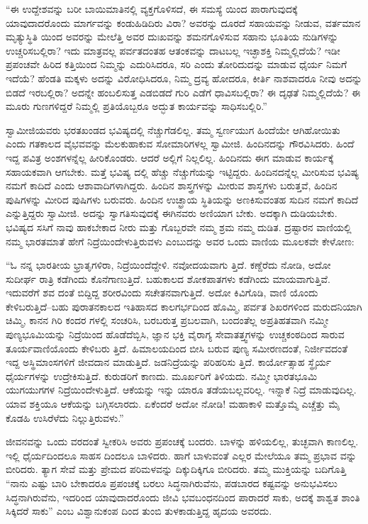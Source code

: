 “ಈ ಉದ್ದೇಶವನ್ನು ಬರೀ ಬಾಯಿಮಾತಿನಲ್ಲಿ ವ್ಯಕ್ತಗೊಳಿಸದೆ, ಈ ಸಮಸ್ಯೆ ಯಿಂದ ಪಾರಾಗುವುದಕ್ಕೆ ಯಾವುದಾದರೊಂದು ಮಾರ್ಗವನ್ನು ಕಂಡುಹಿಡಿದಿರು ವಿರಾ? ಅವರನ್ನು ದೂರದೆ ಸಹಾಯವನ್ನು ನೀಡುವ, ವರ್ತಮಾನ ಮೃತ್ಯುಸ್ಥಿತಿ ಯಿಂದ ಅವರನ್ನು ಮೇಲೆತ್ತಿ ಅವರ ದುಃಖವನ್ನು ಶಮನಗೊಳಿಸುವ ಸಹಾನು ಭೂತಿಯ ನುಡಿಗಳನ್ನು ಉಚ್ಚರಿಸಬಲ್ಲಿರಾ? ಇದು ಮಾತ್ರವಲ್ಲ ಪರ್ವತದಂತಹ ಆತಂಕವನ್ನು ದಾಟಬಲ್ಲ ಇಚ್ಛಾಶಕ್ತಿ ನಿಮ್ಮಲ್ಲಿದೆಯೆ? ಇಡೀ ಪ್ರಪಂಚವೇ ಹಿರಿದ ಕತ್ತಿಯಿಂದ ನಿಮ್ಮನ್ನು ಎದುರಿಸಿದರೂ, ಸರಿ ಎಂದು ತೋರಿದುದನ್ನು ಮಾಡುವ ಧೈರ್ಯ ನಿಮಗೆ ಇದೆಯೆ? ಹೆಂಡತಿ ಮಕ್ಕಳು ಅದನ್ನು ವಿರೋಧಿಸಿದರೂ, ನಿಮ್ಮ ದ್ರವ್ಯ ಹೋದರೂ, ಕೀರ್ತಿ ನಾಶವಾದರೂ ನೀವು ಅದನ್ನು ಬಿಡದೆ ಇರಬಲ್ಲಿರಾ? ಅದನ್ನೇ ಹಂಬಲಿಸುತ್ತ ಎಡಬಿಡದೆ ಗುರಿ ಎಡೆಗೆ ಧಾವಿಸಬಲ್ಲಿರಾ? ಈ ದೃಢತೆ ನಿಮ್ಮಲ್ಲಿದೆಯೆ? ಈ ಮೂರು ಗುಣಗಳಿದ್ದರೆ ನಿಮ್ಮಲ್ಲಿ ಪ್ರತಿಯೊಬ್ಬರೂ ಅದ್ಭುತ ಕಾರ್ಯವನ್ನು ಸಾಧಿಸಬಲ್ಲಿರಿ.”

ಸ್ವಾಮೀಜಿಯವರು ಭರತಖಂಡದ ಭವಿಷ್ಯದಲ್ಲಿ ನೆಚ್ಚುಗೆಡಲಿಲ್ಲ. ತಮ್ಮ ಸ್ವರ್ಣಯುಗ ಹಿಂದೆಯೇ ಆಗಿಹೋಯಿತು ಎಂದು ಗತಕಾಲದ ವೈಭವವನ್ನು ಮೆಲಕುಹಾಕುವ ಸೋಮಾರಿಗಳಲ್ಲ ಸ್ವಾಮೀಜಿ. ಹಿಂದಿನದನ್ನು ಗೌರವಿಸಿದರು. ಹಿಂದೆ ಇದ್ದ ಪವಿತ್ರ ಅಂಶಗಳನ್ನೆಲ್ಲ ಹೀರಿಕೊಂಡರು. ಆದರೆ ಅಲ್ಲಿಗೆ ನಿಲ್ಲಲಿಲ್ಲ. ಹಿಂದಿನದು ಈಗ ಮಾಡುವ ಕಾರ್ಯಕ್ಕೆ ಸಹಾಯಕವಾಗಿ ಆಗಬೇಕು. ಮತ್ತೆ ಭವಿಷ್ಯ ದಲ್ಲಿ ಹೆಚ್ಚು ನೆಚ್ಚುಗೆಯನ್ನು ಇಟ್ಟಿದ್ದರು. ಹಿಂದಿನದನ್ನೆಲ್ಲ ಮೀರಿಸುವ ಭವಿಷ್ಯ ನಮಗೆ ಕಾದಿದೆ ಎಂದು ಆಶಾವಾದಿಗಳಾಗಿದ್ದರು. ಹಿಂದಿನ ಶಾಸ್ತ್ರಗಳನ್ನು ಮೀರುವ ಶಾಸ್ತ್ರಗಳು ಬರುತ್ತವೆ, ಹಿಂದಿನ ಪುಷಿಗಳನ್ನು ಮೀರಿದ ಪುಷಿಗಳು ಬರುವರು. ಹಿಂದಿನ ಉಚ್ಛ್ರಾಯ ಸ್ಥಿತಿಯನ್ನು ಅಣಕಿಸುವಂತಹ ಸುದಿನ ನಮಗೆ ಕಾದಿದೆ ಎನ್ನುತ್ತಿದ್ದರು ಸ್ವಾಮೀಜಿ. ಅದನ್ನು ಸ್ವಾಗತಿಸುವುದಕ್ಕೆ ಈಗಿನವರು ಅಣಿಯಾಗ ಬೇಕು. ಅದಕ್ಕಾಗಿ ದುಡಿಯಬೇಕು. ಭವಿಷ್ಯದ ಸಸಿಗೆ ನಾವು ಹಾಕಬೇಕಾದ ನೀರು ಮತ್ತು ಗೊಬ್ಬರವೇ ನಮ್ಮ ಶ್ರಮ ನಮ್ಮ ದುಡಿತ. ದ್ರಷ್ಟಾರನ ವಾಣಿಯಲ್ಲಿ ನಮ್ಮ ಭಾರತಮಾತೆ ಹೇಗೆ ನಿದ್ರೆಯಿಂದೇಳುತ್ತಿರುವಳು ಎಂಬುದನ್ನು ಅವರ ಒಂದು ವಾಣಿಯ ಮೂಲಕವೇ ಕೇಳೋಣ:

“ಓ ನನ್ನ ಭಾರತೀಯ ಭ್ರಾತೃಗಳಿರಾ, ನಿದ್ರೆಯಿಂದೆದ್ದೇಳಿ. ನವೋದಯವಾಗು ತ್ತಿದೆ. ಕಣ್ದೆರೆದು ನೋಡಿ, ಅದೋ ಸುದೀರ್ಘ ರಾತ್ರಿ ಕಡೆಗಿಂದು ಕೊನೆಗಾಣುತ್ತಿದೆ. ಬಹುಕಾಲದ ಶೋಕಪಾತಗಳು ಕಡೆಗಿಂದು ಮಾಯವಾಗುತ್ತಿವೆ. ಇದುವರೆಗೆ ಶವ ದಂತೆ ಬಿದ್ದಿದ್ದ ಶರೀರವಿಂದು ಸಚೇತನವಾಗುತ್ತಿದೆ. ಅದೋ ಕಿವಿಗೊಡಿ, ವಾಣಿ ಯೊಂದು ಕೇಳಿಬರುತ್ತಿದೆ–ಬಹು ಪುರಾತನಕಾಲದ ಇತಿಹಾಸದ ಕಾಲಗರ್ಭದಿಂದ ಹೊಮ್ಮಿ, ಪರ್ವತ ಶಿಖರಗಳಿಂದ ಮರುದನಿಯಾಗಿ ಚಿಮ್ಮಿ, ಕಾನನ ಗಿರಿ ಕಂದರ ಗಳಲ್ಲಿ ಸಂಚರಿಸಿ, ಬರಬರುತ್ತ ಪ್ರಬಲವಾಗಿ, ಬಂದಂತೆಲ್ಲ ಅಪ್ರತಿಹತವಾಗಿ ನಮ್ಮೀ ಪುಣ್ಯಭೂಮಿಯನ್ನು ನಿದ್ರೆಯಿಂದ ಹೊಡೆದೆಬ್ಬಿಸಿ, ಜ್ಞಾನ ಭಕ್ತಿ ವೈರಾಗ್ಯ ಸೇವಾತತ್ತ್ವಗಳನ್ನು ಉಚ್ಚಕಂಠದಿಂದ ಸಾರುವ ತೂರ್ಯವಾಣಿಯೊಂದು ಕೇಳಿಬರು ತ್ತಿದೆ. ಹಿಮಾಲಯದಿಂದ ಬೀಸಿ ಬರುವ ಪುಣ್ಯ ಸಮೀರಣದಂತೆ, ನಿರ್ಜೀವದಂತೆ ಇದ್ದ ಅಸ್ಥಿಮಾಂಸಗಳಿಗೆ ಜೀವದಾನ ಮಾಡುತ್ತಿದೆ. ಜಡನಿದ್ರೆಯನ್ನು ಪರಿಹರಿಸು ತ್ತಿದೆ. ಕಾರ್ಯೋತ್ಸಾಹ ಸ್ಥೈರ್ಯ ಧೈರ್ಯಗಳನ್ನು ಉದ್ರೇಕಿಸುತ್ತಿದೆ. ಕುರುಡರಿಗೆ ಕಾಣದು. ಮೂರ್ಖರಿಗೆ ತಿಳಿಯದು. ನಮ್ಮೀ ಭಾರತಭೂಮಿ ಯುಗಯುಗಗಳ ನಿದ್ರೆಯಿಂದೇಳುತ್ತಿದೆ. ಆಕೆಯನ್ನು ಇನ್ನು ಯಾರೂ ತಡೆಯಬಲ್ಲವರಿಲ್ಲ. ಇನ್ನಾಕೆ ನಿದ್ರೆ ಮಾಡುವುದಿಲ್ಲ. ಯಾವ ಶಕ್ತಿಯೂ ಆಕೆಯನ್ನು ಬಗ್ಗಿಸಲಾರದು. ಏಕೆಂದರೆ ಅದೋ ನೋಡಿ! ಮಹಾಕಾಳಿ ಮತ್ತೊಮ್ಮೆ ಎಚ್ಚೆತ್ತು ಮೈ ಕೊಡಹಿ ಉಸಿರೆಳೆದು ನಿಲ್ಲುತ್ತಿರುವಳು.”

ಜೀವನವನ್ನು ಒಂದು ವರದಂತೆ ಸ್ವೀಕರಿಸಿ ಅವರು ಪ್ರಪಂಚಕ್ಕೆ ಬಂದರು. ಬಾಳನ್ನು ಹಳಿಯಲಿಲ್ಲ, ತುಚ್ಛವಾಗಿ ಕಾಣಲಿಲ್ಲ. ಇಲ್ಲಿ ಧೈರ್ಯದಿಂದಲೂ ಸಾಹಸ ದಿಂದಲೂ ಬಾಳಿದರು. ಹಾಗೆ ಬಾಳುವಂತೆ ಎಲ್ಲರ ಮೇಲೆಯೂ ತಮ್ಮ ಪ್ರಭಾವ ವನ್ನು ಬೀರಿದರು. ತ್ಯಾಗ ಸೇವೆ ಮತ್ತು ಪ್ರೇಮದ ಪರಿಮಳವನ್ನು ದಿಕ್ಕುದಿಕ್ಕಿಗೂ ಬೀರಿದರು. ತಮ್ಮ ಮುಕ್ತಿಯನ್ನು ಬದಿಗೊತ್ತಿ “ನಾನು ಎಷ್ಟು ಬಾರಿ ಬೇಕಾದರೂ ಪ್ರಪಂಚಕ್ಕೆ ಬರಲು ಸಿದ್ಧನಾಗಿರುವೆನು, ಪಡಬಾರದ ಕಷ್ಟವನ್ನು ಅನುಭವಿಸಲು ಸಿದ್ಧನಾಗಿರುವೆನು, ಇದರಿಂದ ಯಾವುದಾದರೊಂದು ಜೀವಿ ಭವಬಂಧನದಿಂದ ಪಾರಾದರೆ ಸಾಕು, ಅದಕ್ಕೆ ಶಾಶ್ವತ ಶಾಂತಿ ಸಿಕ್ಕಿದರೆ ಸಾಕು” ಎಂಬ ವಿಶ್ವಾನುಕಂಪ ದಿಂದ ತುಂಬಿ ತುಳಕಾಡುತ್ತಿದ್ದ ಹೃದಯ ಅವರದು.

